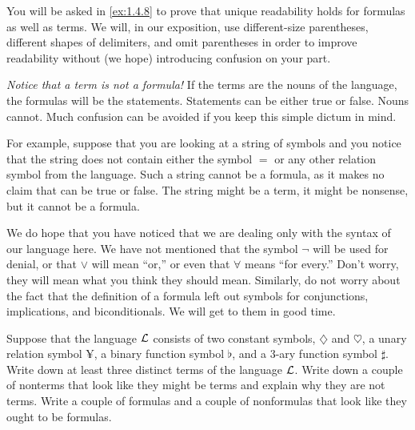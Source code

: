 \begin{note}
  You will be asked in \cref{ex:1.4.8} to prove that unique readability holds for formulas as well as terms.
  We will, in our exposition, use different-size parentheses, different shapes of delimiters, and omit parentheses in order to improve readability without (we hope) introducing confusion on your part.
\end{note}

\begin{note}
  \emph{Notice that a term is not a formula!}
  If the terms are the nouns of the language, the formulas will be the statements.
  Statements can be either true or false.
  Nouns cannot.
  Much confusion can be avoided if you keep this simple dictum in mind.

  For example, suppose that you are looking at a string of symbols and you notice that the string does not contain either the symbol \(=\) or any other relation symbol from the language.
  Such a string cannot be a formula, as it makes no claim that can be true or false.
  The string might be a term, it might be nonsense, but it cannot be a formula.

  We do hope that you have noticed that we are dealing only with the syntax of our language here.
  We have not mentioned that the symbol \(\lnot\) will be used for denial, or that \(\lor\) will mean ``or,'' or even that \(\forall\) means ``for every.''
  Don't worry, they will mean what you think they should mean.
  Similarly, do not worry about the fact that the definition of a formula left out symbols for conjunctions, implications, and biconditionals.
  We will get to them in good time.
\end{note}

\exercisesection

\begin{ex}\label{ex:1.3.1}
  Suppose that the language \(\mathcal{L}\) consists of two constant symbols, \(\diamondsuit\) and \(\heartsuit\), a unary relation symbol \(\yen\), a binary function symbol \(\flat\), and a 3-ary function symbol \(\sharp\).
  Write down at least three distinct terms of the language \(\mathcal{L}\).
  Write down a couple of nonterms that look like they might be terms and explain why they are not terms.
  Write a couple of formulas and a couple of nonformulas that look like they ought to be formulas.
\end{ex}

